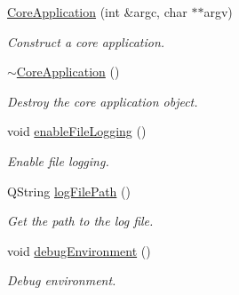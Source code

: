 \begin{DoxyCompactItemize}
\item 
\hyperlink{class_mdt_1_1_core_application_a1f9e0cee5d94ec783ea49ec57030bce9}{Core\+Application} (int \&argc, char $\ast$$\ast$argv)\hypertarget{class_mdt_1_1_core_application_a1f9e0cee5d94ec783ea49ec57030bce9}{}\label{class_mdt_1_1_core_application_a1f9e0cee5d94ec783ea49ec57030bce9}

\begin{DoxyCompactList}\small\item\em Construct a core application. \end{DoxyCompactList}\item 
\hyperlink{class_mdt_1_1_core_application_ac91f0fe77618f10cbdf1f5594c2a82ea}{$\sim$\+Core\+Application} ()\hypertarget{class_mdt_1_1_core_application_ac91f0fe77618f10cbdf1f5594c2a82ea}{}\label{class_mdt_1_1_core_application_ac91f0fe77618f10cbdf1f5594c2a82ea}

\begin{DoxyCompactList}\small\item\em Destroy the core application object. \end{DoxyCompactList}\item 
void \hyperlink{class_mdt_1_1_core_application_aa76faa75f09c7ba30406bfd6b2284bd7}{enable\+File\+Logging} ()
\begin{DoxyCompactList}\small\item\em Enable file logging. \end{DoxyCompactList}\item 
Q\+String \hyperlink{class_mdt_1_1_core_application_a48a2915a7876c259347290f1f501df46}{log\+File\+Path} ()\hypertarget{class_mdt_1_1_core_application_a48a2915a7876c259347290f1f501df46}{}\label{class_mdt_1_1_core_application_a48a2915a7876c259347290f1f501df46}

\begin{DoxyCompactList}\small\item\em Get the path to the log file. \end{DoxyCompactList}\item 
void \hyperlink{class_mdt_1_1_core_application_a500820026134788b2c77c880663339d9}{debug\+Environment} ()
\begin{DoxyCompactList}\small\item\em Debug environment. \end{DoxyCompactList}\end{DoxyCompactItemize}
